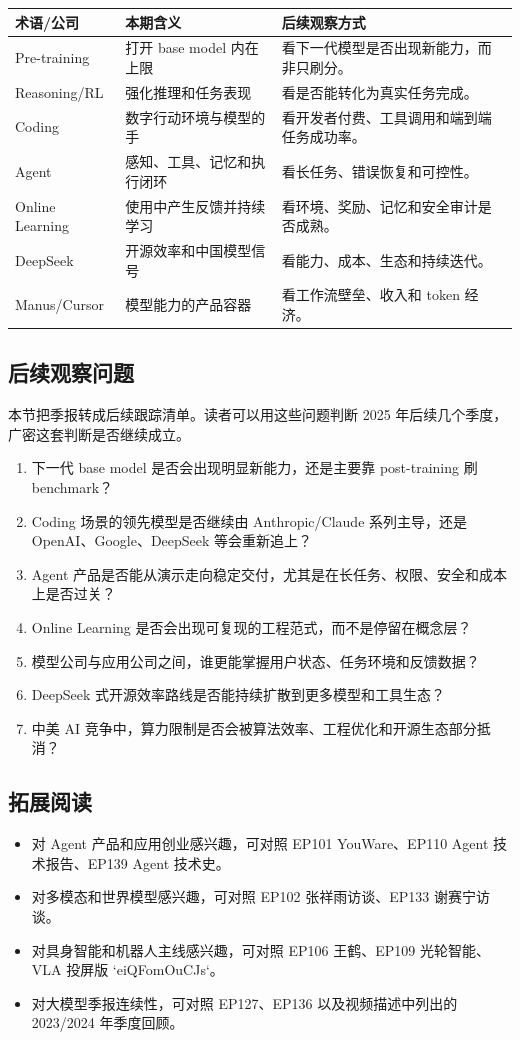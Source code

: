 \documentclass[a4paper]{article}
\begin{document}
\noindent\begin{tabularx}{\textwidth}{p{}p{}X}
\toprule
术语/公司 & 本期含义 & 后续观察方式 \\
\midrule
Pre-training & 打开 base model 内在上限 & 看下一代模型是否出现新能力，而非只刷分。 \\
Reasoning/RL & 强化推理和任务表现 & 看是否能转化为真实任务完成。 \\
Coding & 数字行动环境与模型的手 & 看开发者付费、工具调用和端到端任务成功率。 \\
Agent & 感知、工具、记忆和执行闭环 & 看长任务、错误恢复和可控性。 \\
Online Learning & 使用中产生反馈并持续学习 & 看环境、奖励、记忆和安全审计是否成熟。 \\
DeepSeek & 开源效率和中国模型信号 & 看能力、成本、生态和持续迭代。 \\
Manus/Cursor & 模型能力的产品容器 & 看工作流壁垒、收入和 token 经济。 \\
\bottomrule
\end{tabularx}

\subsection{后续观察问题}

本节把季报转成后续跟踪清单。读者可以用这些问题判断 2025 年后续几个季度，广密这套判断是否继续成立。

\begin{enumerate}
\item 下一代 base model 是否会出现明显新能力，还是主要靠 post-training 刷 benchmark？
\item Coding 场景的领先模型是否继续由 Anthropic/Claude 系列主导，还是 OpenAI、Google、DeepSeek 等会重新追上？
\item Agent 产品是否能从演示走向稳定交付，尤其是在长任务、权限、安全和成本上是否过关？
\item Online Learning 是否会出现可复现的工程范式，而不是停留在概念层？
\item 模型公司与应用公司之间，谁更能掌握用户状态、任务环境和反馈数据？
\item DeepSeek 式开源效率路线是否能持续扩散到更多模型和工具生态？
\item 中美 AI 竞争中，算力限制是否会被算法效率、工程优化和开源生态部分抵消？
\end{enumerate}

\subsection{拓展阅读}

\begin{itemize}
\item 对 Agent 产品和应用创业感兴趣，可对照 EP101 YouWare、EP110 Agent 技术报告、EP139 Agent 技术史。
\item 对多模态和世界模型感兴趣，可对照 EP102 张祥雨访谈、EP133 谢赛宁访谈。
\item 对具身智能和机器人主线感兴趣，可对照 EP106 王鹤、EP109 光轮智能、VLA 投屏版 `eiQFomOuCJs`。
\item 对大模型季报连续性，可对照 EP127、EP136 以及视频描述中列出的 2023/2024 年季度回顾。
\end{itemize}
\end{document}
